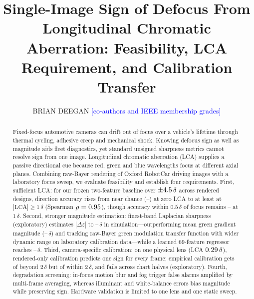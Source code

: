 \documentclass{ieee-ojvt}
\newcommand{\note}[1]{\textcolor{blue}{[#1]}}
\begin{document}

\title{Single-Image Sign of Defocus From Longitudinal Chromatic Aberration: Feasibility, LCA Requirement, and Calibration Transfer}

\author{BRIAN DEEGAN \note{co-authors and IEEE membership grades}}
\authornote{\note{Funding statement, or remove.}}

\begin{abstract}
Fixed-focus automotive cameras can drift out of focus over a vehicle's lifetime through thermal cycling, adhesive creep and mechanical shock.
Knowing defocus sign as well as magnitude aids fleet diagnostics, yet standard unsigned sharpness metrics cannot resolve sign from one image.
Longitudinal chromatic aberration (LCA) supplies a passive directional cue because red, green and blue wavelengths focus at different axial planes.
Combining raw-Bayer rendering of \MthreeNplates{} Oxford RobotCar driving images with a laboratory focus sweep, we evaluate feasibility and establish four requirements.
First, sufficient LCA: for our frozen two-feature baseline over $\pm4.5\,\delta$ across \MthreeNlenses{} rendered designs, direction accuracy rises from near chance (\MthreeLvlZeroDirMin--\MthreeLvlZeroDirMax) at zero LCA to at least \MthreeLvlTopDir{} at $|\mathrm{LCA}|\ge 1\,\delta$ (Spearman $\rho=0.95$), though accuracy within $0.5\,\delta$ of focus remains \MthreeLvlOneNearMin--\MthreeLvlOneNearMax{} at $1\,\delta$.
Second, stronger magnitude estimation: finest-band Laplacian sharpness (exploratory) estimates $|\Delta z|$ to \RefLapAbsMin--\RefLapAbsMax\,$\delta$ in simulation---outperforming mean green gradient magnitude (\RefPhysAbsMin--\RefPhysAbsMax\,$\delta$) and tracking raw-Bayer green modulation transfer function with wider dynamic range on laboratory calibration data---while a learned 69-feature regressor reaches \RefLearnAbsMin--\RefLearnAbsMax\,$\delta$.
Third, camera-specific calibration: on one physical lens (LCA $0.29\,\delta$), rendered-only calibration predicts one sign for every frame; empirical calibration gets \LabBandFarOk{} of \LabBandFarN{} beyond $2\,\delta$ but \LabBandNearOk{} of \LabBandNearN{} within $2\,\delta$, and fails across chart halves (exploratory).
Fourth, degradation screening: in-focus motion blur and fog trigger false alarms amplified by multi-frame averaging, whereas illuminant and white-balance errors bias magnitude while preserving sign.
Hardware validation is limited to one lens and one static sweep.
\end{abstract}
\end{document}
